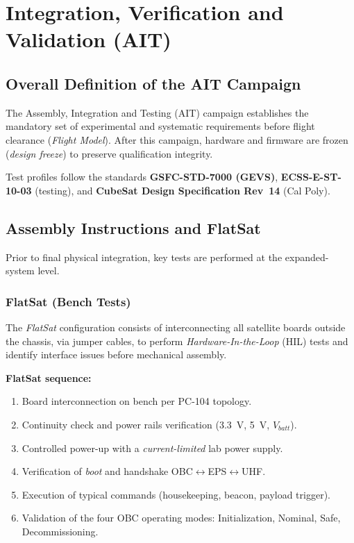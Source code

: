 \chapter{Integration, Verification and Validation (AIT)}

\section{Overall Definition of the AIT Campaign}
The Assembly, Integration and Testing (AIT) campaign establishes the mandatory set of experimental and systematic requirements before flight clearance (\textit{Flight Model}). After this campaign, hardware and firmware are frozen (\textit{design freeze}) to preserve qualification integrity.

Test profiles follow the standards \textbf{GSFC-STD-7000 (GEVS)}, \textbf{ECSS-E-ST-10-03} (testing), and \textbf{CubeSat Design Specification Rev~14} (Cal Poly).

\section{Assembly Instructions and FlatSat}
Prior to final physical integration, key tests are performed at the expanded-system level.

\subsection{FlatSat (Bench Tests)}
The \textit{FlatSat} configuration consists of interconnecting all satellite boards outside the chassis, via jumper cables, to perform \textit{Hardware-In-the-Loop} (HIL) tests and identify interface issues before mechanical assembly.

\textbf{FlatSat sequence:}
\begin{enumerate}
    \item Board interconnection on bench per PC-104 topology.
    \item Continuity check and power rails verification (3.3~V, 5~V, $V_{batt}$).
    \item Controlled power-up with a \textit{current-limited} lab power supply.
    \item Verification of \textit{boot} and handshake OBC$\leftrightarrow$EPS$\leftrightarrow$UHF.
    \item Execution of typical commands (housekeeping, beacon, payload trigger).
    \item Validation of the four OBC operating modes: Initialization, Nominal, Safe, Decommissioning.
\end{enumerate}

